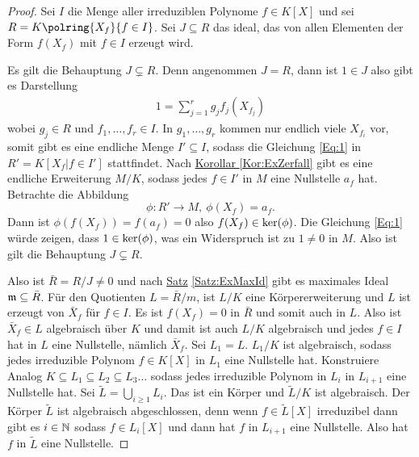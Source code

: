 \begin{proof}
    Sei \(I\) die Menge aller irreduziblen Polynome \(f\in K[X]\) und sei \(R=K\polring{X_f}{f\in I}\). Sei \(J\subseteq R\) das ideal, das von allen Elementen der Form \(f(X_f)\) mit \(f\in I\) erzeugt wird.
    
    Es gilt die Behauptung \(J\subsetneq R\). Denn angenommen \(J=R\), dann ist \(1\in J\) also gibt es Darstellung 
    \begin{align} 1=\sum_{j=1}^rg_jf_j(X_{f_j})\label{Eq:1}
    \end{align} wobei \(g_j\in R\) und \(f_1,\dots,f_r\in I\). In \(g_1,\dots,g_r\) kommen nur endlich viele \(X_{f_i}\) vor, somit gibt es eine endliche Menge \(I'\subseteq I\), sodass die Gleichung \ref{Eq:1} in \(R'=K[X_f| f\in I']\) stattfindet.
    Nach \hyperref[Kor:ExZerfall]{Korollar }\ref{Kor:ExZerfall} gibt es eine endliche Erweiterung \(M/K\), sodass jedes \(f\in I'\) in \(M\) eine Nullstelle \(a_f\) hat. Betrachte die Abbildung \[\phi\colon R'\to M,\ \phi(X_f)=a_f.\]
    Dann ist \(\phi(f(X_f))=f(a_f)=0\) also \(f(X_f)\in \operatorname{ker}(\phi)\). Die Gleichung \ref{Eq:1} würde zeigen, dass \(1\in \operatorname{ker}(\phi)\), was ein Widerspruch ist zu \(1\neq 0\) in \(M\).
    Also ist gilt die Behauptung \(J\subsetneq R\).
    
    Also ist \(\bar R=R/J\neq 0\) und nach \hyperref[Satz:ExMaxId]{Satz} \ref{Satz:ExMaxId} gibt es maximales Ideal \(\mathfrak{m}\subseteq \bar R\). Für den Quotienten \(L=\bar R/m\), ist \(L/K\) eine Körpererweiterung und \(L\) ist erzeugt von \(\bar X_f\) für \(f\in I\). Es ist \(f(X_f)=0\) in \(\bar R\) und somit auch in \(L\). Also ist \(\bar X_f\in L\) algebraisch über \(K\) und damit ist auch \(L/K\) algebraisch und jedes \(f\in I\) hat in \(L\) eine Nullstelle, nämlich \(\bar X_f\).
    Sei \(L_1=L\). \(L_1/K\) ist algebraisch, sodass jedes irreduzible Polynom \(f\in K[X]\) in \(L_1\) eine Nullstelle hat.
    Konstruiere Analog \(K\subseteq L_1\subseteq L_2\subseteq L_3\dots\) sodass jedes irreduzible Polynom in \(L_i\) in \(L_{i+1}\) eine Nullstelle hat. Sei \(\tilde L= \bigcup\limits_{i\geq 1}L_i\). Das ist  ein Körper und \(\tilde L/K\) ist algebraisch.
    Der Körper \(\tilde L\) ist algebraisch abgeschlossen, denn wenn \(f\in \tilde L[X]\) irreduzibel dann gibt es \(i\in\mathbb{N}\) sodass \(f\in L_i[X]\) und dann hat \(f\) in \(L_{i+1}\) eine Nullstelle. Also hat \(f\) in \(\tilde L\) eine Nullstelle.
\end{proof}
